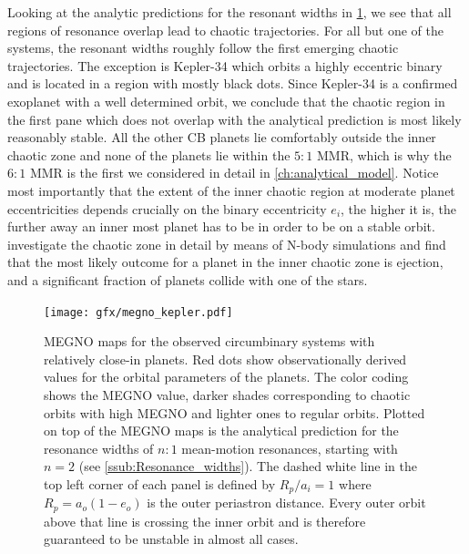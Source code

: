 \documentclass[twoside,openright,titlepage,numbers=noenddot,headinclude,%
                footinclude=true,cleardoublepage=empty,abstractoff, 
                BCOR=5mm,paper=a4,fontsize=11pt,%
                american,%
                ]{scrreprt}%
\begin{document}
Looking at the analytic predictions for the resonant widths in 
\cref{fig:megno_kepler}, we see that all regions of resonance overlap
lead to chaotic trajectories. For all but one of the systems, the 
resonant widths roughly follow the first emerging chaotic trajectories.
The exception is Kepler-34 which orbits a highly eccentric binary
and is located in a region with mostly black dots. Since Kepler-34 
is a confirmed exoplanet with a well determined orbit, we conclude 
that the chaotic region in the first pane which does not overlap with 
the analytical prediction is most likely reasonably stable. All the 
other CB planets lie comfortably outside the inner
chaotic zone and none of the planets lie within the $5:1$ MMR, which
is why the $6:1$ MMR is the first we considered in detail in 
\cref{ch:analytical_model}. Notice most importantly that
the extent of the inner chaotic region at moderate planet eccentricities
depends crucially on the binary eccentricity $e_i$, the higher it is, 
the further away an inner most planet has to be in order to be on a
stable orbit. \citet{Sutherland2015} investigate the chaotic zone
in detail by means of N-body simulations and find that the most likely
outcome for a planet in the inner chaotic zone is ejection, and a 
significant fraction of planets collide with one of the stars.
\begin{figure}[!t]
\centering
\texttt{[image: gfx/megno\_kepler.pdf]}
    \caption[MEGNO maps of circumbinary systems.]{MEGNO maps for 
    the observed circumbinary systems with relatively
    close-in planets. Red dots show observationally derived values for 
    the orbital parameters of the planets. The color coding shows the MEGNO 
    value, darker shades 
    corresponding to chaotic orbits with high MEGNO and lighter ones to 
    regular orbits. Plotted on top of the MEGNO maps is the analytical 
    prediction for the resonance widths of $n:1$ mean-motion resonances, 
    starting with $n=2$ (see \cref{ssub:Resonance_widths}). 
The dashed white line in
    the top left corner of each panel  is defined 
    by $R_p/a_i=1$ where $R_p=a_o(1-e_o)$
    is the outer periastron distance. Every outer orbit above that line
    is crossing the inner orbit and is therefore guaranteed to be 
    unstable in almost all cases.}
\label{fig:megno_kepler}
\end{figure}
\end{document}
